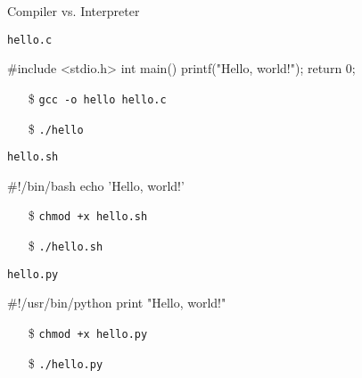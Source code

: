 \begin{frame}[fragile]{Compiler vs. Interpreter}
  \begin{iblock}{\texttt{hello.c}}
    \begin{minipage}{.5\linewidth}
\begin{ccode}
#include <stdio.h>
int main()
{
  printf("Hello, world!\n");
  return 0;
}
\end{ccode}
    \end{minipage}
    \begin{minipage}{.45\linewidth}
    \begin{itemize}
    \item[\$] \texttt{gcc -o hello hello.c}
    \item[\$] \texttt{./hello}
    \end{itemize}
    \end{minipage}
  \end{iblock}
  \begin{iblock}{\texttt{hello.sh}}
    \begin{minipage}{.5\linewidth}
      \begin{shellcode}
        #!/bin/bash
        echo 'Hello, world!'
      \end{shellcode}
    \end{minipage}
    \begin{minipage}{.45\linewidth}
      \begin{enumerate}
      \item[\$] \texttt{chmod +x hello.sh}
      \item[\$] \texttt{./hello.sh}
      \end{enumerate}
    \end{minipage}
  \end{iblock}
  \begin{iblock}{\texttt{hello.py}}
    \begin{minipage}{.5\linewidth}
\begin{pythoncode}
#!/usr/bin/python
print "Hello, world!"
\end{pythoncode}      
    \end{minipage}
    \begin{minipage}{.45\linewidth}
      \begin{enumerate}
      \item[\$] \texttt{chmod +x hello.py}
      \item[\$] \texttt{./hello.py}
      \end{enumerate}
    \end{minipage}
  \end{iblock}
\end{frame}

